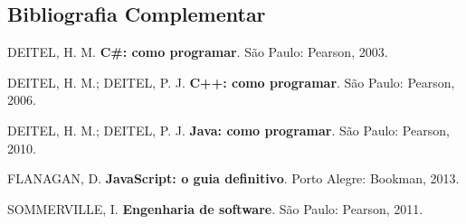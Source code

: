 \documentclass[a4paper,12pt]{article}
\def\faIcon#1{}%
\def\hspace#1{ }%
\begin{document}
\subsection{\faIcon{bookmark}\hspace{4pt}Bibliografia Complementar}
\begin{blocobib}
\begin{enumerate}[leftmargin=1.1cm, label={\textcolor{coracento}{\textbf{[\arabic*]}}}]
  \item DEITEL, H. M. \textbf{C\#: como programar}. São Paulo: Pearson, 2003.
  \item DEITEL, H. M.; DEITEL, P. J. \textbf{C++: como programar}. São Paulo: Pearson, 2006.
  \item DEITEL, H. M.; DEITEL, P. J. \textbf{Java: como programar}. São Paulo: Pearson, 2010.
  \item FLANAGAN, D. \textbf{JavaScript: o guia definitivo}. Porto Alegre: Bookman, 2013.
  \item SOMMERVILLE, I. \textbf{Engenharia de software}. São Paulo: Pearson, 2011.
\end{enumerate}
\end{blocobib}
\end{document}
